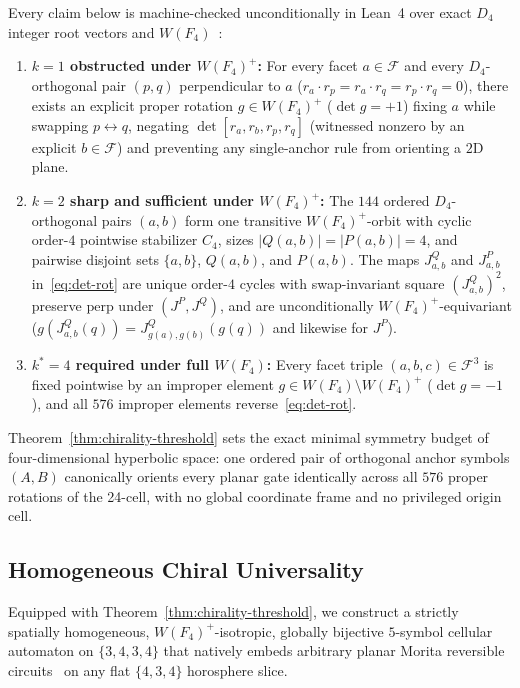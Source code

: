 \begin{theorem}
\label{thm:chirality-threshold}
Every claim below is machine-checked unconditionally in Lean~4 over exact $D_4$ integer root vectors and $W(F_4)$~\cite{pollard2026repo}:
\begin{enumerate}
\item \textbf{$k = 1$ obstructed under $W(F_4)^+$:} For every facet $a \in \mathcal{F}$ and every $D_4$-orthogonal pair $(p,q)$ perpendicular to $a$ ($r_a \cdot r_p = r_a \cdot r_q = r_p \cdot r_q = 0$), there exists an explicit proper rotation $g \in W(F_4)^+$ ($\det g = +1$) fixing $a$ while swapping $p \leftrightarrow q$, negating $\det[r_a, r_b, r_p, r_q]$ (witnessed nonzero by an explicit $b \in \mathcal{F}$) and preventing any single-anchor rule from orienting a $2\mathrm{D}$ plane.
\item \textbf{$k = 2$ sharp and sufficient under $W(F_4)^+$:} The $144$ ordered $D_4$-orthogonal pairs $(a,b)$ form one transitive $W(F_4)^+$-orbit with cyclic order-$4$ pointwise stabilizer $C_4$, sizes $|Q(a,b)| = |P(a,b)| = 4$, and pairwise disjoint sets $\{a,b\}$, $Q(a,b)$, and $P(a,b)$. The maps $J^Q_{a,b}$ and $J^P_{a,b}$ in~\eqref{eq:det-rot} are unique order-$4$ cycles with swap-invariant square $(J^Q_{a,b})^2$, preserve $\mathrm{perp}$ under $(J^P, J^Q)$, and are unconditionally $W(F_4)^+$-equivariant ($g(J^Q_{a,b}(q)) = J^Q_{g(a),g(b)}(g(q))$ and likewise for $J^P$).
\item \textbf{$k^* = 4$ required under full $W(F_4)$:} Every facet triple $(a,b,c) \in \mathcal{F}^3$ is fixed pointwise by an improper element $g \in W(F_4) \setminus W(F_4)^+$ ($\det g = -1$), and all $576$ improper elements reverse~\eqref{eq:det-rot}.
\end{enumerate}
\end{theorem}

Theorem~\ref{thm:chirality-threshold} sets the exact minimal symmetry budget of four-dimensional hyperbolic space: one ordered pair of orthogonal anchor symbols $(A, B)$ canonically orients every planar gate identically across all $576$ proper rotations of the 24-cell, with no global coordinate frame and no privileged origin cell.

\subsection{Homogeneous Chiral Universality}
\label{subsec:homog-chiral-univ}

Equipped with Theorem~\ref{thm:chirality-threshold}, we construct a strictly spatially homogeneous, $W(F_4)^+$-isotropic, globally bijective $5$-symbol cellular automaton on $\{3,4,3,4\}$ that natively embeds arbitrary planar Morita reversible circuits~\cite{morita2001,morita2017book} on any flat $\{4,3,4\}$ horosphere slice.

